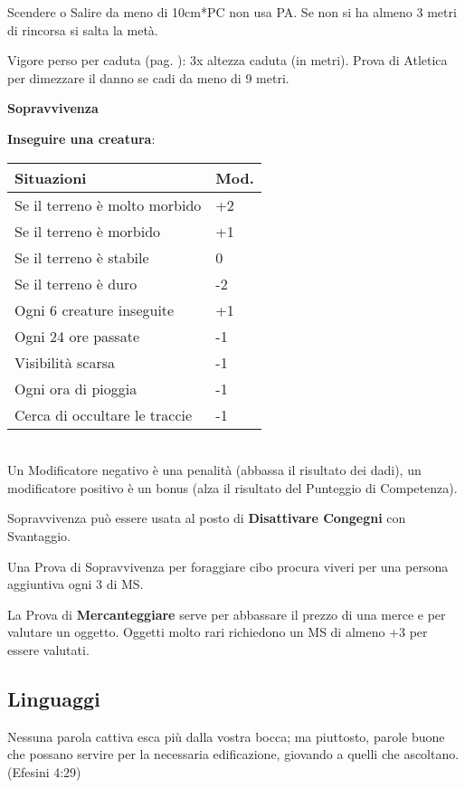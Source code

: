 \documentclass[12pt,a4paper,twoside,openany]{book}
\begin{document}
\begin{multicols}{2}
Scendere o Salire da meno di 10cm*PC non usa PA. Se non si ha almeno 3 metri di rincorsa si salta la metà.

Vigore perso per caduta (pag. \pageref{cadute}): 3x altezza caduta (in metri). Prova di Atletica per dimezzare il danno se cadi da meno di 9 metri.

\medskip

\textbf{Sopravvivenza}

\smallskip

\textbf{Inseguire una creatura}:

\begin{tabular}{ll}
	Situazioni & Mod.\\
	\toprule
	Se il terreno è molto morbido& +2\\
	Se il terreno è morbido& +1\\
	Se il terreno è stabile& 0\\
	Se il terreno è duro& -2\\
	Ogni 6 creature inseguite& +1\\
	Ogni 24 ore passate & -1\\
	Visibilità scarsa&-1\\
	Ogni ora di pioggia&-1 \\
	Cerca di occultare le traccie& -1\\
\end{tabular}\\

Un Modificatore negativo è una penalità (abbassa il risultato dei dadi), un modificatore positivo è un bonus (alza il risultato del Punteggio di Competenza).

Sopravvivenza può essere usata al posto di \textbf{Disattivare Congegni} con Svantaggio.

Una Prova di Sopravvivenza per foraggiare cibo procura viveri per una persona aggiuntiva ogni 3 di MS.

\medskip

La Prova di \textbf{Mercanteggiare} serve per abbassare il prezzo di una merce e per valutare un oggetto. Oggetti molto rari richiedono un MS di almeno +3 per essere valutati.

\end{multicols}

\subsection{Linguaggi}

\begin{changemargin}{0.3cm}{0.3cm}\begin{enfasi}{
Nessuna parola cattiva esca più dalla vostra bocca; ma piuttosto, parole buone che possano servire per la necessaria edificazione, giovando a quelli che ascoltano. (Efesini 4:29)
}\end{enfasi}\end{changemargin}
\end{document}
